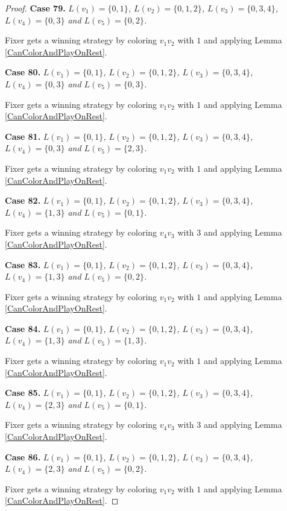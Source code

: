 \documentclass[12pt]{amsart}
\theoremstyle{plain}
\theoremstyle{definition}
\theoremstyle{remark}
\begin{document}
\begin{proof}
\noindent\textbf{Case 79.  }\textit{$L(v_1) = \{0, 1\}$, $L(v_2) = \{0, 1, 2\}$, $L(v_3) = \{0, 3, 4\}$, $L(v_4) = \{0, 3\}$ and $L(v_5) = \{0, 2\}$.}

Fixer gets a winning strategy by coloring $v_1v_2$ with $1$ and applying Lemma \ref{CanColorAndPlayOnRest}.

\noindent\textbf{Case 80.  }\textit{$L(v_1) = \{0, 1\}$, $L(v_2) = \{0, 1, 2\}$, $L(v_3) = \{0, 3, 4\}$, $L(v_4) = \{0, 3\}$ and $L(v_5) = \{0, 3\}$.}

Fixer gets a winning strategy by coloring $v_1v_2$ with $1$ and applying Lemma \ref{CanColorAndPlayOnRest}.

\noindent\textbf{Case 81.  }\textit{$L(v_1) = \{0, 1\}$, $L(v_2) = \{0, 1, 2\}$, $L(v_3) = \{0, 3, 4\}$, $L(v_4) = \{0, 3\}$ and $L(v_5) = \{2, 3\}$.}

Fixer gets a winning strategy by coloring $v_1v_2$ with $1$ and applying Lemma \ref{CanColorAndPlayOnRest}.

\noindent\textbf{Case 82.  }\textit{$L(v_1) = \{0, 1\}$, $L(v_2) = \{0, 1, 2\}$, $L(v_3) = \{0, 3, 4\}$, $L(v_4) = \{1, 3\}$ and $L(v_5) = \{0, 1\}$.}

Fixer gets a winning strategy by coloring $v_4v_3$ with $3$ and applying Lemma \ref{CanColorAndPlayOnRest}.

\noindent\textbf{Case 83.  }\textit{$L(v_1) = \{0, 1\}$, $L(v_2) = \{0, 1, 2\}$, $L(v_3) = \{0, 3, 4\}$, $L(v_4) = \{1, 3\}$ and $L(v_5) = \{0, 2\}$.}

Fixer gets a winning strategy by coloring $v_1v_2$ with $1$ and applying Lemma \ref{CanColorAndPlayOnRest}.

\noindent\textbf{Case 84.  }\textit{$L(v_1) = \{0, 1\}$, $L(v_2) = \{0, 1, 2\}$, $L(v_3) = \{0, 3, 4\}$, $L(v_4) = \{1, 3\}$ and $L(v_5) = \{1, 3\}$.}

Fixer gets a winning strategy by coloring $v_1v_2$ with $1$ and applying Lemma \ref{CanColorAndPlayOnRest}.

\noindent\textbf{Case 85.  }\textit{$L(v_1) = \{0, 1\}$, $L(v_2) = \{0, 1, 2\}$, $L(v_3) = \{0, 3, 4\}$, $L(v_4) = \{2, 3\}$ and $L(v_5) = \{0, 1\}$.}

Fixer gets a winning strategy by coloring $v_4v_3$ with $3$ and applying Lemma \ref{CanColorAndPlayOnRest}.

\noindent\textbf{Case 86.  }\textit{$L(v_1) = \{0, 1\}$, $L(v_2) = \{0, 1, 2\}$, $L(v_3) = \{0, 3, 4\}$, $L(v_4) = \{2, 3\}$ and $L(v_5) = \{0, 2\}$.}

Fixer gets a winning strategy by coloring $v_1v_2$ with $1$ and applying Lemma \ref{CanColorAndPlayOnRest}.


\end{proof}
\end{document}
